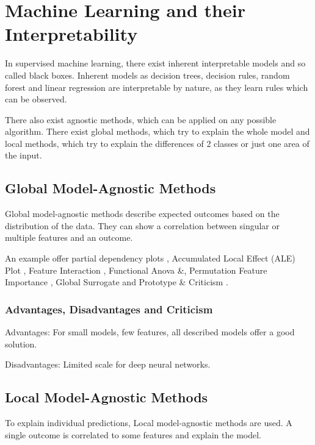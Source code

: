 \chapter{Machine Learning and their Interpretability}


In supervised machine learning, there exist inherent interpretable models and so called black boxes. 
Inherent models as decision trees, decision rules, random forest and linear regression are interpretable by nature, as they learn rules which can be observed.

There also exist agnostic methods, which can be applied on any possible algorithm. There exist global methods, which try to explain the whole model and local methods, which try to explain the differences of 2 classes or just one area of the input.





\section{Global Model-Agnostic Methods}

Global model-agnostic methods describe expected outcomes based on the distribution of the data. They can show a correlation between singular or multiple features and an outcome.

An example offer partial dependency plots \cite{PDP}, Accumulated Local Effect (ALE) Plot \cite{apley2019visualizing}, Feature Interaction \cite{inglis2021visualizing}, Functional Anova \cite{FA1} \&\cite{FA2}, Permutation Feature Importance \cite{fisher2019models}, Global Surrogate and Prototype \& Criticism \cite{pac}.


\subsection{Advantages, Disadvantages and Criticism}

Advantages: For small models, few features, all described models offer a good solution.

Disadvantages: Limited scale for deep neural networks.




\section{Local Model-Agnostic Methods}

To explain individual predictions, Local model-agnostic methods are used. A single outcome is correlated to some features and explain the model.

